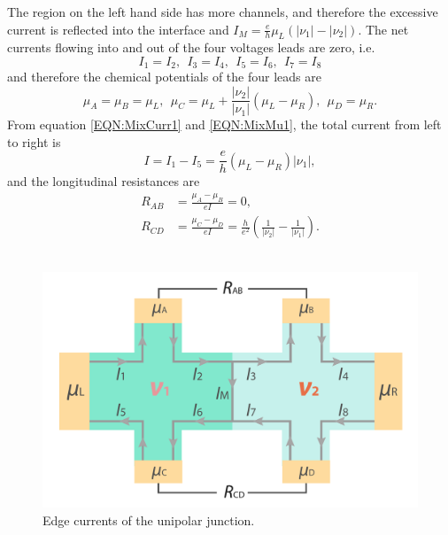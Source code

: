 \documentclass[pdflatex, sectionletters, 12pt]{pittetd}    %
\begin{document}
The region on the left hand side has more channels, and therefore the excessive current is reflected into the interface and $I_M = \frac{e}{h}\mu_L(|\nu_1|-|\nu_2|)$. The net currents flowing into and out of the four voltages leads are zero, i.e.
$$
I_1 = I_2, \ \ I_3 = I_4, \ \ I_5 = I_6, \ \ I_7 = I_8
$$
and therefore the chemical potentials of the four leads are
\begin{equation}
\label{EQN:MixMu1}
\mu_A = \mu_B = \mu_L, \ \ \mu_C = \mu_L + \frac{|\nu_2|}{|\nu_1|}(\mu_L - \mu_R), \ \ \mu_D = \mu_R.
\end{equation}
From equation \ref{EQN:MixCurr1} and \ref{EQN:MixMu1}, the total current from left to right is 
$$
I = I_1 - I_5 = \frac{e}{h}(\mu_L - \mu_R)|\nu_1|,
$$ 
and the longitudinal resistances are 
\begin{equation}
\label{EQN:Mixing1}
\begin{split}
R_{AB} & = \frac{\mu_A - \mu_B}{eI} = 0, \\
R_{CD} & = \frac{\mu_C - \mu_D}{eI} = \frac{h}{e^2}\left(\frac{1}{|\nu_2|} - \frac{1}{|\nu_1|}\right).
\end{split}
\end{equation}
\\

\begin{figure}[h!]
	\centering
	\includegraphics[width=.7\textwidth]{Drawing/Unipolar.pdf}
	\caption{Edge currents of the unipolar junction.}
	\label{FIG:Unipolar}
\end{figure}
\end{document}
